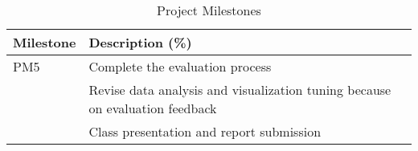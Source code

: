 \begin{table}[h]
 \caption{Project Milestones}\vspace{1ex} %
 \label{tab:milestones}
 \scriptsize
 \centering %
   \begin{tabular}{p{2cm}|p{6cm}}
     Milestone & Description (\%)\\
   \hline
     PM5 & Complete the evaluation process\\
         & Revise data analysis and visualization tuning because on evaluation feedback\\
         & Class presentation and report submission\\
   \end{tabular}
\end{table}
